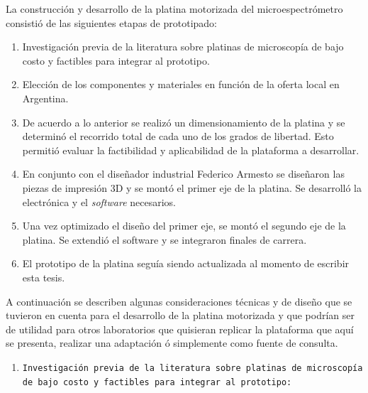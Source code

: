 La construcción y desarrollo de la platina motorizada del microespectrómetro consistió de las siguientes etapas de prototipado:

\begin{enumerate}
\item Investigación previa de la literatura sobre platinas de microscopía de bajo costo y factibles para integrar al prototipo.
\item Elección de los componentes y materiales en función de la oferta local en Argentina.
\item De acuerdo a lo anterior se realizó un dimensionamiento de la platina y se determinó el recorrido total de cada uno de los grados de libertad. Esto permitió evaluar la factibilidad y aplicabilidad de la plataforma a desarrollar.
\item En conjunto con el diseñador industrial Federico Armesto se diseñaron las piezas de impresión 3D y se montó el primer eje de la platina. Se desarrolló la electrónica y el \textit{software} necesarios.
\item Una vez optimizado el diseño del primer eje, se montó el segundo eje de la platina. Se extendió el software y se integraron finales de carrera.
\item El prototipo de la platina seguía siendo actualizada al momento de escribir esta tesis.
\end{enumerate}

A continuación se describen algunas consideraciones técnicas y de diseño que se tuvieron en cuenta para el desarrollo de la platina motorizada y que podrían ser de utilidad para otros laboratorios que quisieran replicar la plataforma que aquí se presenta, realizar una adaptación ó simplemente como fuente de consulta.


\begin{enumerate}
\item \texttt{Investigación previa de la literatura sobre platinas de microscopía de bajo costo y factibles para integrar al prototipo:}
\end{enumerate}

